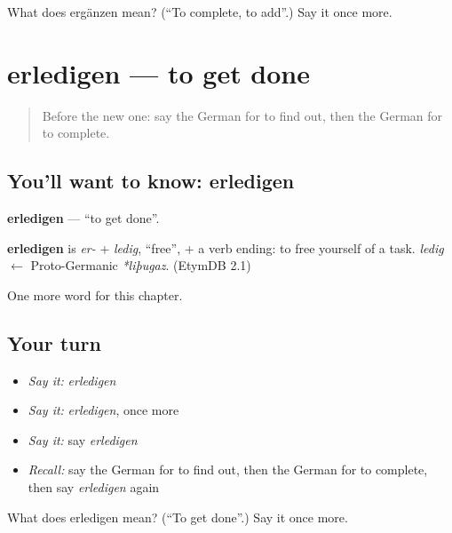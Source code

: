 \begin{tcolorbox}[breakable,colback=teal!4,colframe=teal!35!black,title={Before you move on}]
What does ergänzen mean? (\textquotedblleft{}To complete, to add\textquotedblright{}.) Say it once more.
\end{tcolorbox}
\section[erledigen]{erledigen — to get done}

\label{lesson:GE-C249-erledigen}



\begin{quote}
Before the new one: say the German for to find out, then the German for to complete.
\end{quote}

\subsection*{You'll want to know: erledigen}
\textbf{erledigen} — \textquotedblleft{}to get done\textquotedblright{}.

\begin{cousinweb}
\textbf{erledigen} is \emph{er-} + \emph{ledig}, \textquotedblleft{}free\textquotedblright{}, + a verb ending: to free yourself of a task. \emph{ledig} $\leftarrow$ Proto-Germanic \emph{*liþugaz}. (EtymDB 2.1)
\end{cousinweb}

\begin{grammarlens}[title={What you've built}]
One more word for this chapter.
\end{grammarlens}

\subsection*{Your turn}
\begin{itemize}
\raggedright
  \item \emph{Say it:} \emph{erledigen}
  \item \emph{Say it:} \emph{erledigen}, once more
  \item \emph{Say it:} say \emph{erledigen}
  \item \emph{Recall:} say the German for to find out, then the German for to complete, then say \emph{erledigen} again
\end{itemize}

\begin{tcolorbox}[breakable,colback=teal!4,colframe=teal!35!black,title={Before you move on}]
What does erledigen mean? (\textquotedblleft{}To get done\textquotedblright{}.) Say it once more.
\end{tcolorbox}
